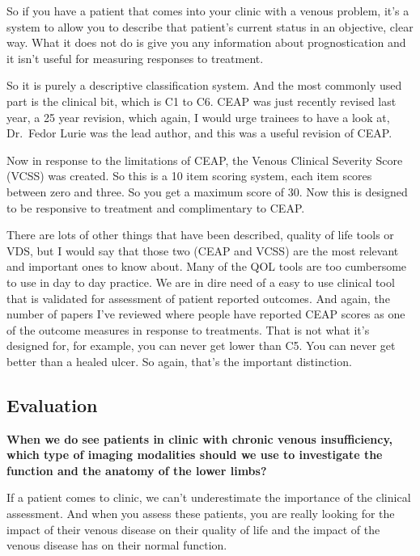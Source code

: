\documentclass[
]{book}
\begin{document}
So if you have a patient that comes into your clinic with a venous
problem, it's a system to allow you to describe that patient's current
status in an objective, clear way. What it does not do is give you any
information about prognostication and it isn't useful for measuring
responses to treatment.

So it is purely a descriptive classification system. And the most
commonly used part is the clinical bit, which is C1 to C6. CEAP was just
recently revised last year, a 25 year revision, which again, I would
urge trainees to have a look at, Dr.~Fedor Lurie was the lead author,
and this was a useful revision of CEAP.\citep{lurie2020}

Now in response to the limitations of CEAP, the Venous Clinical Severity
Score (VCSS) was created. So this is a 10 item scoring system, each item
scores between zero and three. So you get a maximum score of 30. Now
this is designed to be responsive to treatment and complimentary to
CEAP.\citep{vasquez2010}

There are lots of other things that have been described, quality of life
tools or VDS, but I would say that those two (CEAP and VCSS) are the
most relevant and important ones to know about. Many of the QOL tools
are too cumbersome to use in day to day practice. We are in dire need of
a easy to use clinical tool that is validated for assessment of patient
reported outcomes. And again, the number of papers I've reviewed where
people have reported CEAP scores as one of the outcome measures in
response to treatments. That is not what it's designed for, for example,
you can never get lower than C5. You can never get better than a healed
ulcer. So again, that's the important distinction.

\hypertarget{evaluation-18}{%
\subsection{Evaluation}\label{evaluation-18}}

\textbf{When we do see patients in clinic with chronic venous insufficiency,
which type of imaging modalities should we use to investigate the
function and the anatomy of the lower limbs?}

If a patient comes to clinic, we can't underestimate the importance of
the clinical assessment. And when you assess these patients, you are
really looking for the impact of their venous disease on their quality
of life and the impact of the venous disease has on their normal
function.
\end{document}

